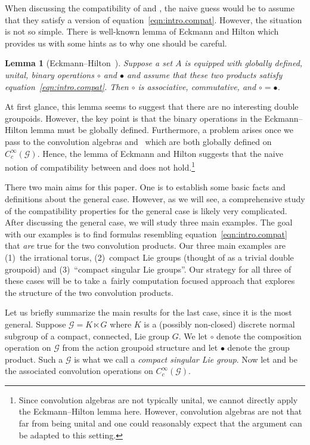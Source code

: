 \documentclass[10pt,a4paper]{amsart}
\numberwithin{equation}{section}
\newtheorem{Lemma}[Theorem]{Lemma}
\theoremstyle{definition}
\newcommand{\CG}{\mathcal{G}}
\newcommand{\stardot}{\overset{{\bullet}}{*}}
\newcommand{\starcirc}{\overset{\circ}{*}}
\begin{document}
When discussing the compatibility of \smash{$ \starcirc $} and \smash{$ \stardot $}, the naive guess would be to assume that they satisfy a version of equation~\eqref{eqn:intro.compat}. However, the situation is not so simple. There is well-known lemma of Eckmann and Hilton which provides us with some hints as to why one should be careful.
\begin{Lemma}[Eckmann--Hilton~\cite{EckmannHilton}]
   Suppose a set $ A $ is equipped with globally defined, unital, binary operations $ \circ $ and $ \bullet $ and assume that these two products satisfy equation~\eqref{eqn:intro.compat}. Then $ \circ $ is associative, commutative, and $ \circ = \bullet $.
\end{Lemma}
At first glance, this lemma seems to suggest that there are no interesting double groupoids. However, the key point is that the binary operations in the Eckmann--Hilton lemma must be globally defined. Furthermore, a problem arises once we pass to the convolution algebras \smash{$ \stardot$} and~\smash{$ \starcirc$} which are both globally defined on $ C_c^\infty(\CG) $. Hence, the lemma of Eckmann and Hilton suggests that the naive notion of compatibility between \smash{$ \starcirc$} and \smash{$ \stardot$} does not hold.\footnote{Since convolution algebras are not typically unital, we cannot directly apply the Eckmann--Hilton lemma here. However, convolution algebras are not that far from being unital and one could reasonably expect that the argument can be adapted to this setting.}

There two main aims for this paper. One is to establish some basic facts and definitions about the general case. However, as we will see, a comprehensive study of the compatibility properties for the general case is likely very complicated. After discussing the general case, we will study three main examples. The goal with our examples is to find formulas resembling equation~\eqref{eqn:intro.compat} that \emph{are} true for the two convolution products. Our three main examples are (1)~the irrational torus, (2)~compact Lie groups (thought of as a trivial double groupoid) and (3)~``compact singular Lie groups''. Our strategy for all three of these cases will be to take a~fairly computation focused approach that explores the structure of the two convolution products.

Let us briefly summarize the main results for the last case, since it is the most general. Suppose $ \CG = K \ltimes G $ where $ K $ is a (possibly non-closed) discrete normal subgroup of a compact, connected, Lie group $ G $. We let $ \circ $ denote the composition operation on $ \CG $ from the action groupoid structure and let $ \bullet $ denote the group product. Such a $ \CG $ is what we call a \emph{compact singular Lie group}. Now let \smash{$ \starcirc $} and \smash{$ \stardot $} be the associated convolution operations on $ C_c^\infty(\CG) $.
\end{document}
